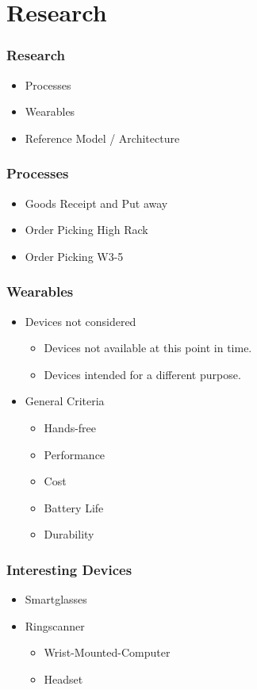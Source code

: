 \section{Research}
\begin{frame}\frametitle{Research}
	\begin{itemize}
		\item Processes
		\item Wearables
		\item Reference Model / Architecture
	\end{itemize}
\end{frame}

\begin{frame}\frametitle{Processes}
	\begin{itemize}
		\item Goods Receipt and Put away
		\item Order Picking High Rack
		\item Order Picking W3-5 \pause \checkmark
	\end{itemize}
\end{frame}

\begin{frame}\frametitle{Wearables}
	\begin{itemize}
		\item Devices not considered
		\begin{itemize}
			\item Devices not available at this point in time.
			\item Devices intended for a different purpose.
		\end{itemize}
		\item General Criteria
		\begin{itemize}
			\item Hands-free
			\item Performance
			\item Cost
			\item Battery Life
			\item Durability
		\end{itemize}
	\end{itemize}
\end{frame}
\begin{frame}\frametitle{Interesting Devices}
	\begin{itemize}
		\item Smartglasses
		\item Ringscanner
		\begin{itemize}
			\item Wrist-Mounted-Computer
			\item Headset
		\end{itemize}
	\end{itemize}
\end{frame}

